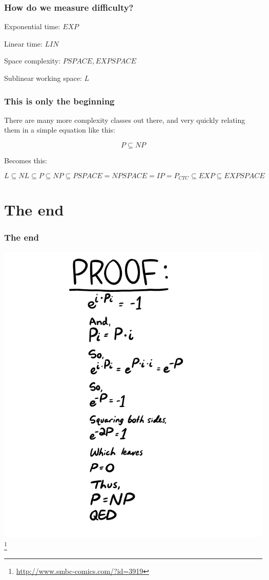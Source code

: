 \documentclass[aspectratio=169]{beamer}
\begin{document}
\begin{frame}
\frametitle{How do we measure difficulty?}
Exponential time: $EXP$

Linear time: $LIN$

Space complexity: $PSPACE, EXPSPACE$

Sublinear working space: $L$
\end{frame}

\begin{frame}
\frametitle{This is only the beginning}
There are many more complexity classes out there, and very quickly relating them in a simple equation like this:

$$P \subseteq NP$$

Becomes this:

$$L \subseteq NL \subseteq P \subseteq NP \subseteq PSPACE = NPSPACE = IP = P_{CTC} \subseteq EXP \subseteq EXPSPACE$$
\end{frame}

\section{The end}

\begin{frame}
\begin{center}
\frametitle{The end}
\includegraphics[scale=0.2]{smbc_comic}\footnote{\url{http://www.smbc-comics.com/?id=3919}}
\end{center}
\end{frame}
\end{document}
